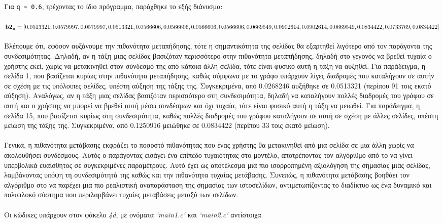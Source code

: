 \documentclass[a4paper, 14pt]{article}   %
\begin{document}
Για \texttt{q = 0.6}, τρέχοντας το ίδιο πρόγραμμα, παράχθηκε το εξής διάνυσμα:\\\\
$\mathbf{b2_n} = [0.0513321, 0.0579997, 0.0579997, 0.0513321, 0.0566606, 0.0566606, 0.0566606,\\ 0.0566606,  0.0669549,  0.0902614, 0.0902614, 0.0669549, 0.0834422, 0.0733769, 0.0834422]$\\\\
Βλέπουμε ότι, εφόσον αυξάνουμε την πιθανότητα μεταπήδησης, τότε η σημαντικότητα της σελίδας θα εξαρτηθεί λιγότερο από τον παράγοντα της συνδεσιμότητας. Δηλαδή, αν η τάξη μιας σελίδας βασιζόταν περισσότερο στην πιθανότητα μεταπήδησης, δηλαδή στο γεγονός να βρεθεί τυχαία ο χρήστης εκεί, χωρίς να μετακινηθεί στον σύνδεσμό της από κάποια άλλη σελίδα, τότε είναι φυσικό αυτή η τάξη να αυξηθεί. Για παράδειγμα, η σελίδα 1, που βασίζεται κυρίως στην πιθανότητα μεταπήδησης, καθώς σύμφωνα με το γράφο υπάρχουν λίγες διαδρομές που καταλήγουν σε αυτήν σε σχέση με τις υπόλοιπες σελίδες, υπέστη αύξηση της τάξης της. Συγκεκριμένα, από 0.0268246 αυξήθηκε σε 0.0513321 (περίπου 91 τοις εκατό αύξηση). Αναλόγως, αν η τάξη μιας σελίδας βασιζόταν περισσότερο στη συνδεσιμότητα, δηλαδή να καταλήγουν πολλές διαδρομές του γράφου σε αυτή και ο χρήστης να μπορεί να βρεθεί αυτή μέσω συνδέσμων και όχι τυχαία, τότε είναι φυσικό αυτή η τάξη να μειωθεί. Για παράδειγμα, η σελίδα 15, που βασίζεται κυρίως στη συνδεσιμότητα, καθώς πολλές διαδρομές του γράφου καταλήγουν σε αυτή σε σχέση με άλλες σελίδες, υπέστη μείωση της τάξης της. Συγκεκριμένα, από 0.1250916 μειώθηκε σε 0.0834422 (περίπου 33 τοις εκατό μείωση).\\\\
Γενικά, η πιθανότητα μετάβασης εκφράζει το ποσοστό πιθανότητας που ένας χρήστης θα μετακινηθεί από μια σελίδα σε μια άλλη χωρίς να ακολουθήσει συνδέσμους. Αυτός ο παράγοντας εισάγει ένα επίπεδο τυχαιότητας στο μοντέλο, αποτρέποντας τον αλγόριθμο από το να γίνει υπερβολικά ευαίσθητος σε συγκεκριμένες παραμέτρους. Αυτό έχει ως αποτέλεσμα μια πιο ισορροπημένη αξιολόγηση της σημασίας μιας σελίδας, λαμβάνοντας υπόψη τη συνδεσιμότητά της καθώς και την πιθανότητα τυχαίας μετάβασης. Συνεπώς, η πιθανότητα μετάβασης βοηθάει τον αλγόριθμο στο να παρέχει μια πιο ρεαλιστική αναπαράσταση της σημασίας των ιστοσελίδων, αντιμετωπίζοντας το διαδίκτυο ως ένα δυναμικό και πολυπλοκό σύστημα που περιλαμβάνει τυχαίες μεταβάσεις μεταξύ των σελίδων.\\\\ Οι κώδικες υπάρχουν στον φάκελο \emph{4d}, με ονόματα \emph{`main1.c`} και \emph{`main2.c`} αντίστοιχα.
\end{document}
